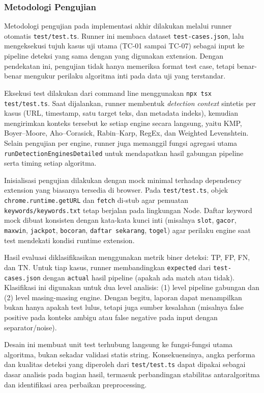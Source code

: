\sloppy

\subsubsection{Metodologi Pengujian}
Metodologi pengujian pada implementasi akhir dilakukan melalui runner otomatis \texttt{test/test.ts}. Runner ini membaca dataset \texttt{test-cases.json}, lalu mengeksekusi tujuh kasus uji utama (TC-01 sampai TC-07) sebagai input ke pipeline deteksi yang sama dengan yang digunakan extension. Dengan pendekatan ini, pengujian tidak hanya memeriksa format test case, tetapi benar-benar mengukur perilaku algoritma inti pada data uji yang terstandar.

Eksekusi test dilakukan dari command line menggunakan \texttt{npx tsx test/test.ts}. Saat dijalankan, runner membentuk \textit{detection context} sintetis per kasus (URL, timestamp, satu target teks, dan metadata indeks), kemudian mengirimkan konteks tersebut ke setiap engine secara langsung, yaitu KMP, Boyer--Moore, Aho--Corasick, Rabin--Karp, RegEx, dan Weighted Levenshtein. Selain pengujian per engine, runner juga memanggil fungsi agregasi utama \texttt{runDetectionEnginesDetailed} untuk mendapatkan hasil gabungan pipeline serta timing setiap algoritma.

Inisialisasi pengujian dilakukan dengan mock minimal terhadap dependency extension yang biasanya tersedia di browser. Pada \texttt{test/test.ts}, objek \texttt{chrome.runtime.getURL} dan \texttt{fetch} di-stub agar pemuatan \texttt{keywords/keywords.txt} tetap berjalan pada lingkungan Node. Daftar keyword mock dibuat konsisten dengan kata-kata kunci inti (misalnya \texttt{slot}, \texttt{gacor}, \texttt{maxwin}, \texttt{jackpot}, \texttt{bocoran}, \texttt{daftar sekarang}, \texttt{togel}) agar perilaku engine saat test mendekati kondisi runtime extension.

Hasil evaluasi diklasifikasikan menggunakan metrik biner deteksi: TP, FP, FN, dan TN. Untuk tiap kasus, runner membandingkan \texttt{expected} dari \texttt{test-cases.json} dengan \texttt{actual} hasil pipeline (apakah ada match atau tidak). Klasifikasi ini digunakan untuk dua level analisis: (1) level pipeline gabungan dan (2) level masing-masing engine. Dengan begitu, laporan dapat menampilkan bukan hanya apakah test lulus, tetapi juga sumber kesalahan (misalnya false positive pada konteks ambigu atau false negative pada input dengan separator/noise).

Desain ini membuat unit test terhubung langsung ke fungsi-fungsi utama algoritma, bukan sekadar validasi statis string. Konsekuensinya, angka performa dan kualitas deteksi yang diperoleh dari \texttt{test/test.ts} dapat dipakai sebagai dasar analisis pada bagian hasil, termasuk perbandingan stabilitas antaralgoritma dan identifikasi area perbaikan preprocessing.

